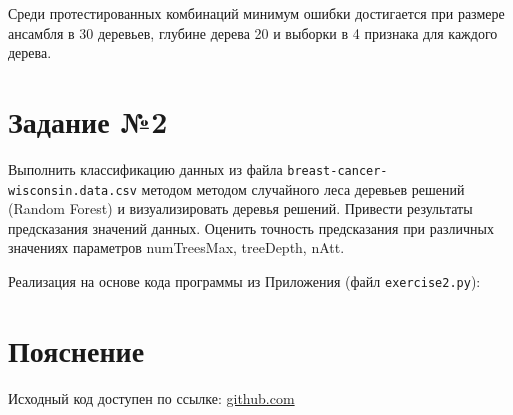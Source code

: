 \documentclass{article} %
\begin{document}
Среди протестированных комбинаций минимум ошибки достигается
при размере ансамбля в 30 деревьев,
глубине дерева 20 и выборки в 4 признака для каждого дерева.

\clearpage
\section{Задание №2}
Выполнить классификацию данных из файла
\verb$breast-cancer-wisconsin.data.csv$ методом
методом случайного леса деревьев решений (Random Forest) и визуализировать деревья
решений. Привести результаты предсказания значений данных. Оценить точность
предсказания при различных значениях параметров numTreesMax, treeDepth, nAtt.
\bigskip

Реализация на основе кода программы из Приложения (файл \verb$exercise2.py$):
\bigskip
%
%
%
% 
%
%

\section{Пояснение}
Исходный код доступен по ссылке:
\href{https://github.com/SvichkarevAnatoly/Course-Python-Bioinformatics/tree/master/semester2/task9}
{github.com}
\end{document}
